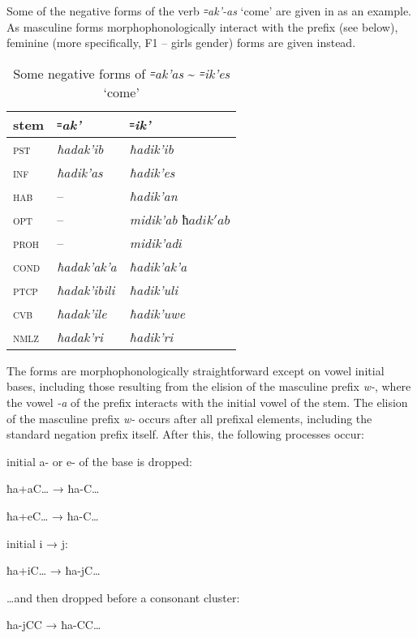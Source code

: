 \documentclass[output=paper]{langsci/langscibook}
\begin{document}
Some of the negative forms of the verb \emph{꞊ak'-as} `come' are given
in %
 as an example. As masculine forms
morphophonologically interact with the prefix (see below), feminine
(more specifically, F1 – girls gender) forms are given instead.

\begin{table}[t]
\caption{Some negative forms of \emph{꞊ak'as} \textasciitilde{} \emph{꞊ik'es} `come'}\label{tab:4:10}

\begin{tabular}{@{}lll@{}}
\toprule
{stem} & {\textit{꞊ak'}} & {\textit{꞊ik'}}\tabularnewline \midrule
\textsc{pst} & \emph{ħadak'ib} & \emph{ħadik'ib}\tabularnewline
\textsc{inf} & \emph{ħadik'as} & \emph{ħadik'es}\tabularnewline
\textsc{hab} & – & \emph{ħadik'an}\tabularnewline
\textsc{opt} & – & \emph{midik'ab \(ħadik'ab\)}\tabularnewline
\textsc{proh} & – & \emph{midik'ad\(i\)}\tabularnewline
\textsc{cond} & \emph{ħadak'ak'a} & \emph{ħadik'ak'a}\tabularnewline
\textsc{ptcp} & \emph{ħadak'ibili} & \emph{ħadik'uli}\tabularnewline
\textsc{cvb} & \emph{ħadak'ile} & \emph{ħadik'uwe}\tabularnewline
\textsc{nmlz} & \emph{ħadak'ri} & \emph{ħadik'ri}\tabularnewline
\bottomrule
\end{tabular}
\vspace{-\jot}
\end{table}

The forms are morphophonologically straightforward except on vowel
initial bases, including those resulting from the elision of the
masculine prefix \emph{w-}, where the vowel \emph{-a} of the prefix interacts
with the initial vowel of the stem. The elision of the masculine prefix
\emph{w-} occurs after all prefixal elements, including the standard
negation prefix itself. After this, the following processes occur:


\ea %
initial a- or e- of the base is dropped:
\begin{center}
ħa+aC\ldots{} → ħa-C\ldots{}

ħa+eC\ldots{} → ħa-C\ldots{}  
\end{center}



\ex %
initial i → j:
\begin{center}
  ħa+iC\ldots{} → ħa-jC\ldots{}
\end{center}

\ex %
\ldots{}and then dropped before a consonant cluster:
\begin{center}
ħa-jCC → ħa-CC\ldots{}
\end{center}
\end{document}

